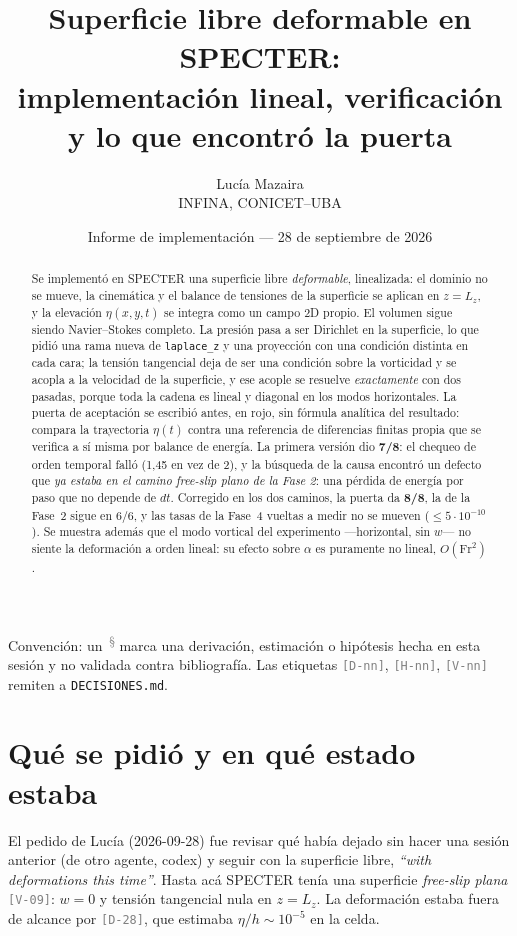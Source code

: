 \documentclass[11pt,a4paper]{article}
\title{Superficie libre deformable en SPECTER:\\
implementación lineal, verificación y lo que encontró la puerta}
\author{Lucía Mazaira\\ \small INFINA, CONICET--UBA}
\date{\small Informe de implementación --- 28 de septiembre de 2026}
\newcommand{\etq}[1]{\textcolor{gray}{\texttt{[#1]}}}
\newcommand{\archivo}[1]{\nolinkurl{#1}}
\newcommand{\propio}{\textsuperscript{\textcolor{gray}{\,\S}}}
\newcommand{\PuertaFinal}{8/8}
\begin{document}
\maketitle

\begin{abstract}
\noindent
Se implementó en SPECTER una superficie libre \emph{deformable}, linealizada: el dominio
no se mueve, la cinemática y el balance de tensiones de la superficie se aplican en
$z=L_z$, y la elevación $\eta(x,y,t)$ se integra como un campo 2D propio. El volumen sigue
siendo Navier--Stokes completo. La presión pasa a ser Dirichlet en la superficie, lo que
pidió una rama nueva de \texttt{laplace\_z} y una proyección con una condición distinta en
cada cara; la tensión tangencial deja de ser una condición sobre la vorticidad y se
acopla a la velocidad de la superficie, y ese acople se resuelve \emph{exactamente} con
dos pasadas, porque toda la cadena es lineal y diagonal en los modos horizontales. La
puerta de aceptación se escribió antes, en rojo, sin fórmula analítica del resultado:
compara la trayectoria $\eta(t)$ contra una referencia de diferencias finitas propia que
se verifica a sí misma por balance de energía. La primera versión dio \textbf{7/8}: el
chequeo de orden temporal falló (1{,}45 en vez de 2), y la búsqueda de la causa encontró
un defecto que \emph{ya estaba en el camino free-slip plano de la Fase 2}: una pérdida de
energía por paso que no depende de $dt$. Corregido en los dos caminos, la puerta da
\textbf{\PuertaFinal}, la de la Fase~2 sigue en 6/6, y las tasas de la Fase~4 vueltas a
medir no se mueven ($\le5\cdot10^{-10}$). Se muestra además que el modo vortical del experimento
---horizontal, sin $w$--- no siente la deformación a orden lineal: su efecto sobre
$\alpha$ es puramente no lineal, $O(\mathrm{Fr}^2)$.
\end{abstract}

\noindent\small Convención: un \propio{} marca una derivación, estimación o hipótesis
hecha en esta sesión y no validada contra bibliografía. Las etiquetas \etq{D-nn},
\etq{H-nn}, \etq{V-nn} remiten a \archivo{DECISIONES.md}.\normalsize

\tableofcontents

\section{Qué se pidió y en qué estado estaba}

El pedido de Lucía (2026-09-28) fue revisar qué había dejado sin hacer una sesión
anterior (de otro agente, codex) y seguir con la superficie libre, \emph{``with
deformations this time''}. Hasta acá SPECTER tenía una superficie \emph{free-slip plana}
\etq{V-09}: $w=0$ y tensión tangencial nula en $z=L_z$. La deformación estaba fuera de
alcance por \etq{D-28}, que estimaba $\eta/h\sim10^{-5}$ en la celda.
\end{document}
